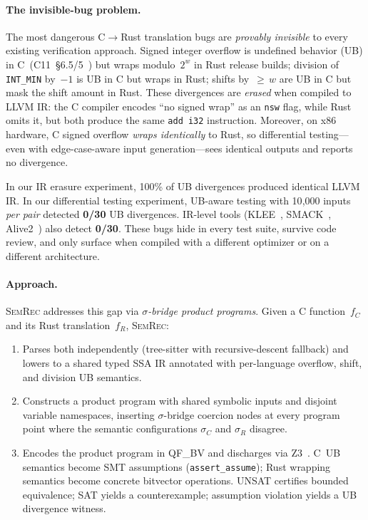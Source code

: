 \documentclass[10pt,a4paper]{article}
\begin{document}
\paragraph{The invisible-bug problem.}
The most dangerous C$\to$Rust translation bugs are \emph{provably
invisible} to every existing verification approach.  Signed integer
overflow is undefined behavior (UB) in C~(C11~\S6.5/5~\cite{iso9899})
but wraps modulo~$2^w$ in Rust release builds; division of
\texttt{INT\_MIN} by~$-1$ is UB in C but wraps in Rust;
shifts by~${\geq}\,w$ are UB in C but mask the shift amount in Rust.
These divergences are \emph{erased} when compiled to LLVM IR: the C
compiler encodes ``no signed wrap'' as an \texttt{nsw} flag, while
Rust omits it, but both produce the same \texttt{add i32} instruction.
Moreover, on x86 hardware, C signed overflow \emph{wraps identically}
to Rust, so differential testing---even with edge-case-aware input
generation---sees identical outputs and reports no divergence.

In our IR erasure experiment, 100\% of UB divergences produced
identical LLVM IR.  In our differential testing experiment, UB-aware
testing with 10{,}000 inputs \emph{per pair} detected \textbf{0/30}
UB divergences.  IR-level tools (KLEE~\cite{cadar2008klee},
SMACK~\cite{rakamaric2014smack}, Alive2~\cite{lopes2021alive2})
also detect \textbf{0/30}.  These bugs hide in every test suite,
survive code review, and only surface when compiled with a different
optimizer or on a different architecture.

\paragraph{Approach.}
\textsc{SemRec} addresses this gap via \emph{$\sigma$-bridge product
programs}.  Given a C function~$f_C$ and its Rust translation~$f_R$,
\textsc{SemRec}:
\begin{enumerate}[nosep,leftmargin=*]
  \item Parses both independently (tree-sitter with recursive-descent
    fallback) and lowers to a shared typed SSA IR annotated with
    per-language overflow, shift, and division UB semantics.
  \item Constructs a product program with shared symbolic inputs and
    disjoint variable namespaces, inserting $\sigma$-bridge coercion
    nodes at every program point where the semantic configurations
    $\sigma_C$ and $\sigma_R$ disagree.
  \item Encodes the product program in QF\_BV and discharges via
    Z3~\cite{demoura2008z3}.  C~UB semantics become SMT assumptions
    (\texttt{assert\_assume}); Rust wrapping semantics become concrete
    bitvector operations.  UNSAT certifies bounded equivalence; SAT
    yields a counterexample; assumption violation yields a UB
    divergence witness.
\end{enumerate}
\end{document}
